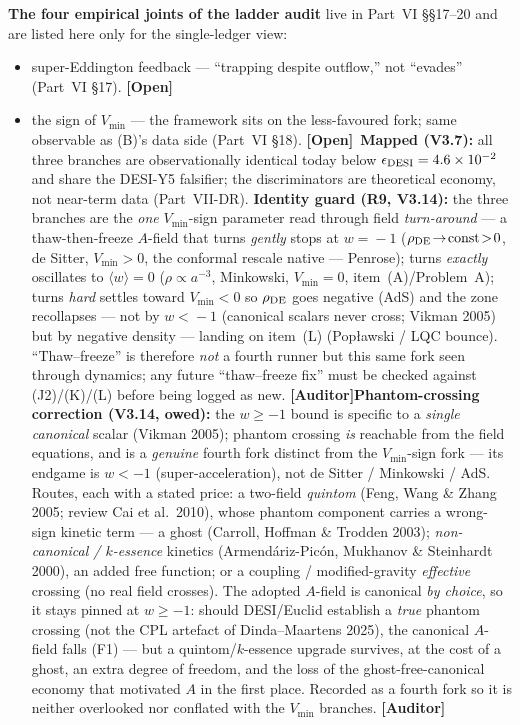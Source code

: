 \documentclass[11pt]{article}
\newcommand{\Auditor}{\textbf{\textcolor{teal!55!black}{[Auditor]}}}
\newcommand{\open}{\textcolor{red!70!black}{\textbf{[Open]}}}
\begin{document}
\textbf{The four empirical joints of the ladder audit} live in Part~VI \S\S17--20 and are listed here only for the single-ledger view:
\begin{itemize}[leftmargin=2.9em,itemsep=2pt]
\item[\textbf{(J1)}] super-Eddington feedback --- ``trapping despite outflow,'' not ``evades'' (Part~VI \S17). \open
\item[\textbf{(J2)}] the sign of $V_{\min}$ --- the framework sits on the less-favoured fork; same observable as (B)'s data side (Part~VI \S18). \open\ \textbf{Mapped (V3.7):} all three branches are observationally identical today below $\epsilon_{\rm DESI}=4.6\times10^{-2}$ and share the DESI-Y5 falsifier; the discriminators are theoretical economy, not near-term data (Part~VII-DR). \textbf{Identity guard (R9, V3.14):} the three branches are the \emph{one} $V_{\min}$-sign parameter read through field \emph{turn-around} --- a thaw-then-freeze $A$-field that turns \emph{gently} stops at $w\!=\!-1$ ($\rho_{\rm DE}\!\to\!{\rm const}\!>\!0$, de Sitter, $V_{\min}\!>\!0$, the conformal rescale native --- Penrose); turns \emph{exactly} oscillates to $\langle w\rangle\!=\!0$ ($\rho\!\propto\!a^{-3}$, Minkowski, $V_{\min}\!=\!0$, item~(A)/Problem~A); turns \emph{hard} settles toward $V_{\min}\!<\!0$ so $\rho_{\rm DE}$ goes negative (AdS) and the zone recollapses --- not by $w\!<\!-1$ (canonical scalars never cross; Vikman 2005) but by negative density --- landing on item~(L) (Pop\l awski / LQC bounce). ``Thaw--freeze'' is therefore \emph{not} a fourth runner but this same fork seen through dynamics; any future ``thaw--freeze fix'' must be checked against (J2)/(K)/(L) before being logged as new. \Auditor \textbf{Phantom-crossing correction (V3.14, owed):} the $w\ge-1$ bound is specific to a \emph{single canonical} scalar (Vikman 2005); phantom crossing \emph{is} reachable from the field equations, and is a \emph{genuine} fourth fork distinct from the $V_{\min}$-sign fork --- its endgame is $w<-1$ (super-acceleration), not de Sitter / Minkowski / AdS. Routes, each with a stated price: a two-field \emph{quintom} (Feng, Wang \& Zhang 2005; review Cai et al.\ 2010), whose phantom component carries a wrong-sign kinetic term --- a ghost (Carroll, Hoffman \& Trodden 2003); \emph{non-canonical / $k$-essence} kinetics (Armend\'ariz-Pic\'on, Mukhanov \& Steinhardt 2000), an added free function; or a coupling / modified-gravity \emph{effective} crossing (no real field crosses). The adopted $A$-field is canonical \emph{by choice}, so it stays pinned at $w\ge-1$: should DESI/Euclid establish a \emph{true} phantom crossing (not the CPL artefact of Dinda--Maartens 2025), the canonical $A$-field falls (F1) --- but a quintom/$k$-essence upgrade survives, at the cost of a ghost, an extra degree of freedom, and the loss of the ghost-free-canonical economy that motivated $A$ in the first place. Recorded as a fourth fork so it is neither overlooked nor conflated with the $V_{\min}$ branches. \Auditor

\end{itemize}
\end{document}
